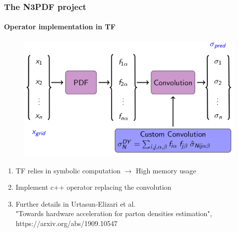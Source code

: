 \documentclass[aspectratio=43]{beamer}
\begin{document}
\begin{frame}

\frametitle{The N3PDF project}
\framesubtitle{Operator implementation in TF}

\begin{figure}
\includegraphics[width = 8.5 cm]{plots/section2/TF_convolution2.png}
\end{figure}

\begin{enumerate}
\item \footnotesize TF relies in symbolic computation $\longrightarrow$ High memory usage
\item \footnotesize Implement c++ operator replacing the convolution
\item Further details in Urtasun-Elizari et al.\\
{\color{blue}"Towards hardware acceleration for parton densities estimation",\\ https://arxiv.org/abs/1909.10547}
\end{enumerate}

\end{frame}
\end{document}
